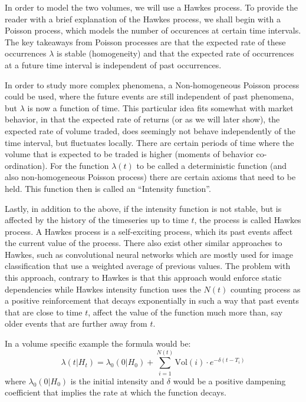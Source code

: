 In order to model the two volumes, we will use a Hawkes process. To provide the reader with a brief explanation of the Hawkes process, we shall begin with a Poisson process, which models the number of occurences at certain time intervals. The key takeaways from Poisson processes are that the expected rate of these occurrences \( \lambda \) is stable (homogeneity) and that the expected rate of occurrences at a future time interval is independent of past occurrences. 

In order to study more complex phenomena, a Non-homogeneous Poisson process could be used, where the future events are still independent of past phenomena, but \( \lambda \) is now a function of time. This particular idea fits somewhat with market behavior, in that the expected rate of returns (or as we will later show), the expected rate of volume traded, does seemingly not behave independently of the time interval, but fluctuates locally. There are certain periods of time where the volume that is expected to be traded is higher (moments of behavior co-ordination). For the function \( \lambda(t) \) to be called a deterministic function (and also non-homogeneous Poisson process) there are certain axioms that need to be held. This function then is called an “Intensity function”.

Lastly, in addition to the above, if the intensity function is not stable, but is affected by the history of the timeseries up to time \(t\), the process is called Hawkes process. A Hawkes process is a self-exciting process, which its past events affect the current value of the process. There also exist other similar approaches to Hawkes, such as convolutional neural networks which are mostly used for image classification that use a weighted average of previous values. The problem with this approach, contrary to Hawkes is that this approach would enforce static dependencies while Hawkes intensity function uses the \(N(t)\) counting process as a positive reinforcement that decays exponentially in such a way that past events that are close to time \(t\), affect the value of the function much more than, say older events that are further away from \(t\). 

In a volume specific example the formula would be:
\[ \lambda(t|H_t) = \lambda_0(0|H_0) + \sum_{i=1}^{N(t)}\text{Vol}(i) \cdot e^{-\delta(t-T_i)} \]
where \(\lambda_0(0|H_0) \) is the initial intensity and \( \delta \) would be a positive dampening coefficient that implies the rate at which the function decays.

